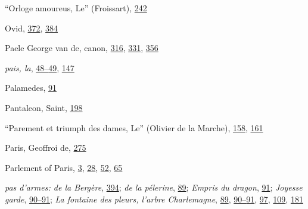 ``Orloge amoureus, Le'' (Froissart),
\protect\hyperlink{16_Chapter_Nine__THE_DECLINE_OF_SYM.xhtmlux5cux23page_242}{242}

Ovid,
\protect\hyperlink{21_Chapter_Thirteen__IMAGE_AND_WORD.xhtmlux5cux23page_372}{372},
\protect\hyperlink{22_Chapter_Fourteen__THE_COMING_OF.xhtmlux5cux23page_384}{384}

Paele George van de, canon,
\protect\hyperlink{20_ILLUSTRATIONS_FOLLOW_PAGE.xhtmlux5cux23page_316}{316},
\protect\hyperlink{21_Chapter_Thirteen__IMAGE_AND_WORD.xhtmlux5cux23page_331}{331},
\protect\hyperlink{21_Chapter_Thirteen__IMAGE_AND_WORD.xhtmlux5cux23page_356}{356}

\emph{\protect\hypertarget{25_INDEX.xhtmlux5cux23page_463}{}{}pais, la},
\protect\hyperlink{09_Chapter_Two__THE_CRAVING_FOR_A_M.xhtmlux5cux23page_48}{48--}\protect\hyperlink{09_Chapter_Two__THE_CRAVING_FOR_A_M.xhtmlux5cux23page_49}{49},
\protect\hyperlink{11_Chapter_Four__THE_FORMS_OF_LOVE.xhtmlux5cux23page_147}{147}

Palamedes,
\protect\hyperlink{10_Chapter_Three__THE_HEROIC_DREAM.xhtmlux5cux23page_91}{91}

Pantaleon, Saint,
\protect\hyperlink{13_Chapter_Six__THE_DEPICTION_OF_TH.xhtmlux5cux23page_198}{198}

``Parement et triumph des dames, Le'' (Olivier de la Marche),
\protect\hyperlink{12_Chapter_Five__THE_VISION_OF_DEAT.xhtmlux5cux23page_158}{158},
\protect\hyperlink{12_Chapter_Five__THE_VISION_OF_DEAT.xhtmlux5cux23page_161}{161}

Paris, Geoffroi de,
\protect\hyperlink{18_Chapter_Eleven__THE_FORMS_OF_THO.xhtmlux5cux23page_275}{275}

Parlement of Paris,
\protect\hyperlink{08_Chapter_One__THE_PASSIONATE_INTE.xhtmlux5cux23page_3}{3},
\protect\hyperlink{08_Chapter_One__THE_PASSIONATE_INTE.xhtmlux5cux23page_28}{28},
\protect\hyperlink{09_Chapter_Two__THE_CRAVING_FOR_A_M.xhtmlux5cux23page_52}{52},
\protect\hyperlink{10_Chapter_Three__THE_HEROIC_DREAM.xhtmlux5cux23page_65}{65}

\emph{pas d'armes: de la Bergère},
\protect\hyperlink{22_Chapter_Fourteen__THE_COMING_OF.xhtmlux5cux23page_394}{394};
\emph{de la pélerine},
\protect\hyperlink{10_Chapter_Three__THE_HEROIC_DREAM.xhtmlux5cux23page_89}{89};
\emph{Empris du dragon},
\protect\hyperlink{10_Chapter_Three__THE_HEROIC_DREAM.xhtmlux5cux23page_91}{91};
\emph{Joyesse garde},
\protect\hyperlink{10_Chapter_Three__THE_HEROIC_DREAM.xhtmlux5cux23page_90}{90--}\protect\hyperlink{10_Chapter_Three__THE_HEROIC_DREAM.xhtmlux5cux23page_91}{91};
\emph{La fontaine des pleurs, l'arbre Charlemagne},
\protect\hyperlink{10_Chapter_Three__THE_HEROIC_DREAM.xhtmlux5cux23page_89}{89},
\protect\hyperlink{10_Chapter_Three__THE_HEROIC_DREAM.xhtmlux5cux23page_90}{90--}\protect\hyperlink{10_Chapter_Three__THE_HEROIC_DREAM.xhtmlux5cux23page_91}{91},
\protect\hyperlink{10_Chapter_Three__THE_HEROIC_DREAM.xhtmlux5cux23page_97}{97},
\protect\hyperlink{10_Chapter_Three__THE_HEROIC_DREAM.xhtmlux5cux23page_109}{109},
\protect\hyperlink{13_Chapter_Six__THE_DEPICTION_OF_TH.xhtmlux5cux23page_181}{181}

